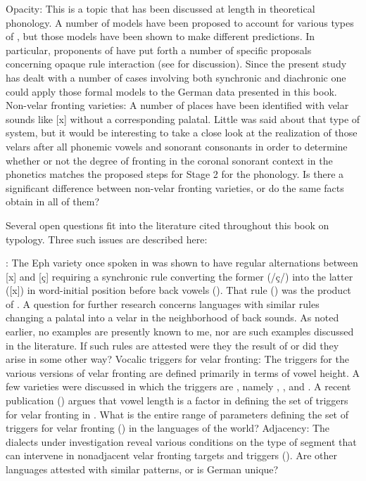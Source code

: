 \ex%
    \label{ex:18:5}
          Opacity: This is a topic that has been discussed at length in theoretical phonology. A number of models have been proposed to account for various types of , but those models have been shown to make different predictions. In particular, proponents of  have put forth a number of specific proposals concerning opaque rule interaction (see \citealt{McCarthy2002} for discussion). Since the present study has dealt with a number of cases involving both synchronic and diachronic  one could apply those formal models to the German data presented in this book.
\ex%
    \label{ex:18:6}
          Non-velar fronting varieties: A number of places have been identified with velar sounds like [x] without a corresponding palatal. Little was said about that type of system, but it would be interesting to take a close look at the realization of those velars after all phonemic vowels and sonorant consonants in order to determine whether or not the degree of fronting in the coronal sonorant context in the phonetics matches the proposed steps for Stage 2 for the phonology. Is there a significant difference between non-velar fronting varieties, or do the same facts obtain in all of them?
\z 

Several open questions fit into the literature cited throughout this book on  typology. Three such issues are described here:

\eanoraggedright %
    \label{ex:18:7}
           : The Eph variety once spoken in  was shown to have regular alternations between [x] and [ç] requiring a synchronic rule converting the former (/ç/) into the latter ([x]) in word-initial position before back vowels (). That rule () was the product of . A question for further research concerns languages with similar rules changing a palatal into a velar in the neighborhood of back sounds. As noted earlier, no examples are presently known to me, nor are such examples discussed in the  literature. If such rules are attested were they the result of  or did they arise in some other way?
\ex%
    \label{ex:18:8}
           Vocalic triggers for velar fronting: The triggers for the various versions of velar fronting are defined primarily in terms of vowel height. A few varieties were discussed in which the triggers are , namely , , and . A recent publication (\citealt{CardosoHoneybone2022}) argues that vowel length is a factor in defining the set of triggers for velar fronting in . What is the entire range of parameters defining the set of triggers for velar fronting () in the languages of the world?
\ex%
    \label{ex:18:9}
          Adjacency: The dialects under investigation reveal various conditions on the type of segment that can intervene in nonadjacent velar fronting targets and triggers  (). Are other languages attested with similar patterns, or is German unique?
\z 

